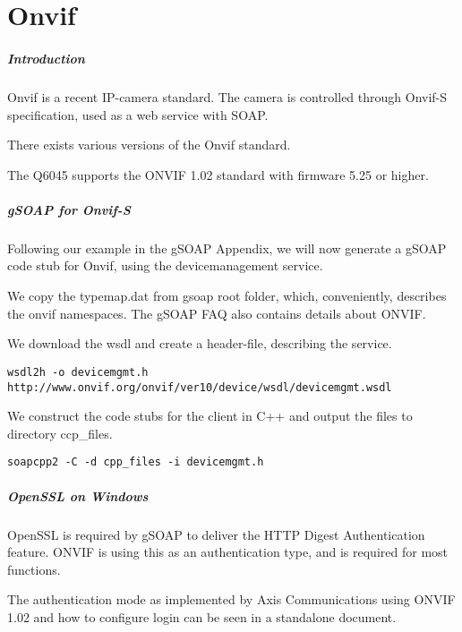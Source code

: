 \chapter{Onvif}
\paragraph{Introduction}
Onvif is a recent IP-camera standard. The camera is controlled through Onvif-S specification, used as a web service with SOAP.

There exists various versions of the Onvif standard.

The Q6045 supports the ONVIF 1.02 standard with firmware 5.25 or higher.

\paragraph{gSOAP for Onvif-S}
Following our example in the gSOAP Appendix, we will now generate a gSOAP code stub for Onvif, using the devicemanagement service.

We copy the typemap.dat from gsoap root folder, which, conveniently, describes the onvif namespaces. The gSOAP FAQ also contains details about ONVIF.


We download the wsdl and create a header-file, describing the service.
\begin{lstlisting}[style=BashInputStyle]
    wsdl2h -o devicemgmt.h http://www.onvif.org/onvif/ver10/device/wsdl/devicemgmt.wsdl
\end{lstlisting}

We construct the code stubs for the client in C++ and output the files to directory ccp\_files.
\begin{lstlisting}[style=BashInputStyle]
    soapcpp2 -C -d cpp_files -i devicemgmt.h
\end{lstlisting}



\paragraph{OpenSSL on Windows}
OpenSSL is required by gSOAP to deliver the HTTP Digest Authentication feature. ONVIF is using this as an authentication type, and is required for most functions.

The authentication mode as implemented by Axis Communications using ONVIF 1.02 and how to configure login can be seen in a standalone document.

